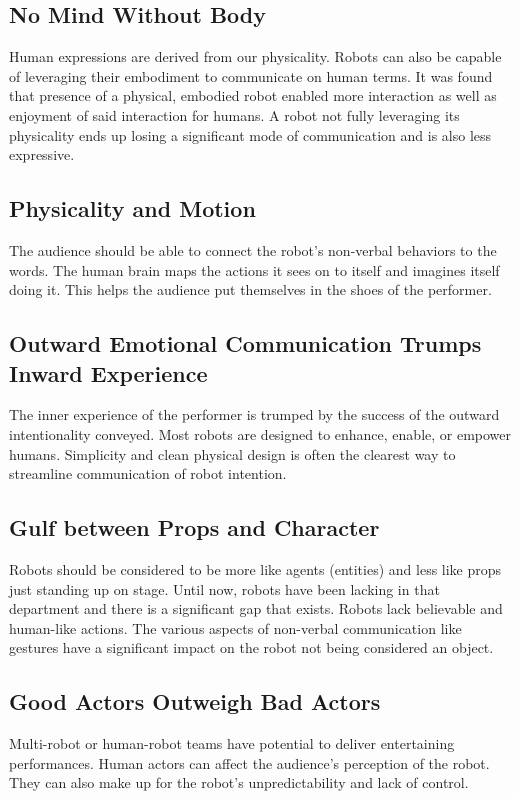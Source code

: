 \documentclass[onecolumn, draftclsnofoot,10pt, compsoc]{IEEEtran}
\begin{document}
\subsection{No Mind Without Body}
Human expressions are derived from our physicality. Robots can also be capable of leveraging their embodiment to communicate on human terms. It was found that presence of a physical, embodied robot enabled more interaction as well as enjoyment of said interaction for humans. A robot not fully leveraging its physicality ends up losing a significant mode of communication and is also less expressive.
	
\subsection{Physicality and Motion}
The audience should be able to connect the robot's non-verbal behaviors to the words. The human brain maps the actions it sees on to itself and imagines itself doing it. This helps the audience put themselves in the shoes of the performer. 

\subsection{Outward Emotional Communication Trumps Inward Experience}
The inner experience of the performer is trumped by the success of the outward intentionality conveyed. Most robots are designed to enhance, enable, or empower humans. Simplicity and clean physical design is often the clearest way to streamline communication of robot intention. 

\subsection{Gulf between Props and Character}
Robots should be considered to be more like agents (entities) and less like props just standing up on stage. Until now, robots have been lacking in that department and there is a significant gap that exists. Robots lack believable and human-like actions. The various aspects of non-verbal communication like gestures have a significant impact on the robot not being considered an object.

\subsection{Good Actors Outweigh Bad Actors}
Multi-robot or human-robot teams have potential to deliver entertaining performances. Human actors can affect the audience's perception of the robot. They can also make up for the robot's unpredictability and lack of control.
\end{document}
